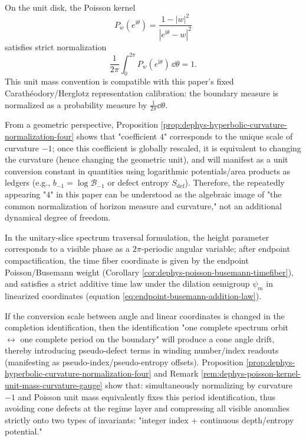 \begin{remark}\label{rem:dephys-poisson-kernel-unit-mass-curvature-gauge}
On the unit disk, the Poisson kernel
\[
P_{w}(e^{\mathrm{i}\theta})=\frac{1-|w|^{2}}{|e^{\mathrm{i}\theta}-w|^{2}}
\]
satisfies strict normalization
\[
\boxed{\;\frac{1}{2\pi}\int_{0}^{2\pi}P_{w}(e^{\mathrm{i}\theta})\,\dd\theta=1.\;}
\]
This unit mass convention is compatible with this paper's fixed Carathéodory/Herglotz representation calibration: the boundary measure is normalized as a probability measure by \(\frac{1}{2\pi}\dd\theta\).
\par
From a geometric perspective, Proposition \ref{prop:dephys-hyperbolic-curvature-normalization-four} shows that "coefficient \(4\)" corresponds to the unique scale of curvature \(-1\); once this coefficient is globally rescaled, it is equivalent to changing the curvature (hence changing the geometric unit), and will manifest as a unit conversion constant in quantities using logarithmic potentials/area products as ledgers (e.g., \(b_{-1}=\log\mathcal{B}_{-1}\) or defect entropy \(S_{\mathrm{def}}\)).
Therefore, the repeatedly appearing "\(4\)" in this paper can be understood as the algebraic image of "the common normalization of horizon measure and curvature," not an additional dynamical degree of freedom.
\end{remark}

\begin{remark}\label{rem:dephys-horizon-regularity-no-cone-defect}
In the unitary-slice spectrum traversal formulation, the height parameter corresponds to a visible phase as a \(2\pi\)-periodic angular variable;
after endpoint compactification, the time fiber coordinate is given by the endpoint Poisson/Busemann weight (Corollary \ref{cor:dephys-poisson-busemann-timefiber}), and satisfies a strict additive time law under the dilation semigroup \(\psi_m\) in linearized coordinates (equation \eqref{eq:endpoint-busemann-addition-law}).
\par
If the conversion scale between angle and linear coordinates is changed in the completion identification, then the identification "one complete spectrum orbit \(\leftrightarrow\) one complete period on the boundary" will produce a cone angle drift, thereby introducing pseudo-defect terms in winding number/index readouts (manifesting as pseudo-index/pseudo-entropy offsets).
Proposition \ref{prop:dephys-hyperbolic-curvature-normalization-four} and Remark \ref{rem:dephys-poisson-kernel-unit-mass-curvature-gauge} show that: simultaneously normalizing by curvature \(-1\) and Poisson unit mass equivalently fixes this period identification, thus avoiding cone defects at the regime layer and compressing all visible anomalies strictly onto two types of invariants: "integer index + continuous depth/entropy potential."
\end{remark}

